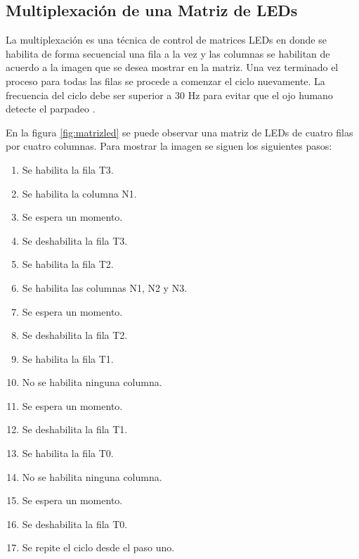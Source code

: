 
\subsection{Multiplexación de una Matriz de LEDs }
La multiplexación es una técnica de control de matrices LEDs en donde se habilita de forma secuencial una fila a la vez y las columnas se habilitan de acuerdo a la imagen que se desea mostrar en la matriz. Una vez terminado el proceso para todas las filas se procede a comenzar el ciclo nuevamente. La frecuencia del ciclo debe ser superior a 30 Hz para evitar que el ojo humano detecte el parpadeo \citep{MULTIPLEXADO}.

En la figura \ref{fig:matrizled} se puede observar una matriz de LEDs de cuatro filas por cuatro columnas. Para mostrar la imagen se siguen los siguientes pasos:

\begin{enumerate}
\item Se habilita la fila T3.
\item Se habilita la columna N1.
\item Se espera un momento.
\item Se deshabilita la fila T3.
\item Se habilita la fila T2.
\item Se habilita las columnas N1, N2 y N3.
\item Se espera un momento.
\item Se deshabilita la fila T2.
\item Se habilita la fila T1.
\item No se habilita ninguna columna.
\item Se espera un momento.
\item Se deshabilita la fila T1.
\item Se habilita la fila T0.
\item No se habilita ninguna columna.
\item Se espera un momento.
\item Se deshabilita la fila T0.
\item Se repite el ciclo desde el paso uno.
\end{enumerate}


